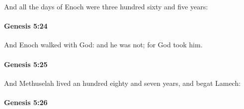 			And all the days of Enoch were three hundred sixty and five years:


		\paragraph{Genesis 5:24} %
			\label{GENESIS-5-24}

			And Enoch walked with God: and he was not; for God took him.


		\paragraph{Genesis 5:25} %
			\label{GENESIS-5-25}

			And Methuselah lived an hundred eighty and seven years, and begat Lamech:


		\paragraph{Genesis 5:26} %
			\label{GENESIS-5-26}

